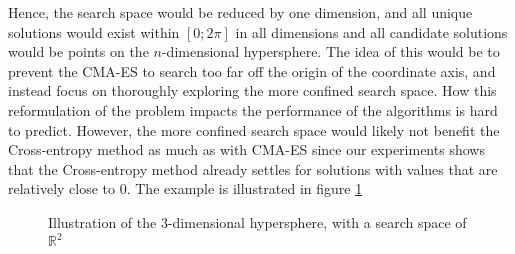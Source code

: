 Hence, the search space would be reduced by one dimension, and all unique solutions would exist
within $[0; 2 \pi]$ in all dimensions and all candidate solutions would be points on the $n$-dimensional
hypersphere. The idea of this would be to prevent the CMA-ES to search too far off the origin of the
coordinate axis, and instead focus on thoroughly exploring the more confined search space.
How this reformulation of the problem impacts the performance of the algorithms is hard to predict.
However, the more confined search space would likely not benefit the Cross-entropy method
as much as with CMA-ES since our experiments shows that the Cross-entropy method already settles for 
solutions with values that are relatively close to 0.
The example is illustrated in figure \ref{fig:searchInAngles}

\begin{figure}[H]
\begin{center}
\end{center}
\caption{Illustration of the 3-dimensional hypersphere, with a search space of $\mathbb{R}^2$
\label{fig:searchInAngles}}
\end{figure}


